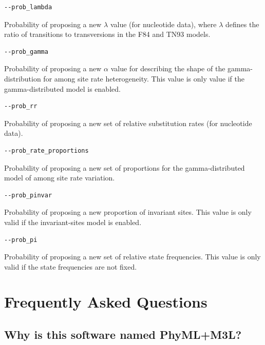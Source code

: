 \documentclass[11pt]{article}
\begin{document}
\begin{description}
\begin{verbatim}
--prob_lambda
\end{verbatim}
Probability of proposing a new $\lambda$ value (for nucleotide data), where $\lambda$ defines the ratio of transitions to transversions in the F84 and TN93 models.

\begin{verbatim}
--prob_gamma
\end{verbatim}
Probability of proposing a new $\alpha$ value for describing the shape of the gamma-distribution for among site rate heterogeneity.  This value is only value if the gamma-distributed model is enabled.

\begin{verbatim}
--prob_rr
\end{verbatim}
Probability of proposing a new set of relative substitution rates (for nucleotide data).

\begin{verbatim}
--prob_rate_proportions
\end{verbatim}
Probability of proposing a new set of proportions for the gamma-distributed model of among site rate variation.

\begin{verbatim}
--prob_pinvar
\end{verbatim}
Probability of proposing a new proportion of invariant sites.  This value is only valid if the invariant-sites model is enabled.

\begin{verbatim}
--prob_pi
\end{verbatim}
Probability of proposing a new set of relative state frequencies.  This value is only valid if the state frequencies are not fixed.

\end{description}




\pagebreak
\section{Frequently Asked Questions}
\subsection{Why is this software named PhyML+M3L?}
\end{document}
